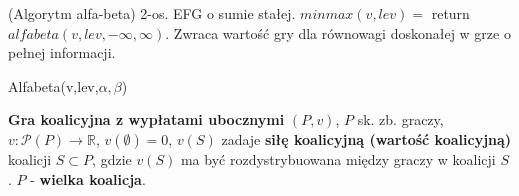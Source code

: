 \begin{twierdzenie}{(Algorytm alfa-beta)}
    2-os. EFG o sumie stałej. $minmax(v,lev)=$ return $alfabeta(v,lev,-\infty,\infty)$. Zwraca wartość gry dla równowagi doskonałej w grze o pełnej informacji.
\end{twierdzenie}
\begin{algorithm}[H]
    \SetAlgoLined
    
    \caption{Alfabeta(v,lev,$\alpha,\beta$)}
\end{algorithm}
\begin{definicja}{\textbf{Gra koalicyjna z wypłatami ubocznymi}}
    $(P,v)$, $P$ sk. zb. graczy, $v:\mathcal{P}(P)\rightarrow\mathbb{R}$, $v(\emptyset)=0$, $v(S)$ zadaje 
    \textbf{siłę koalicyjną (wartość koalicyjną)} koalicji $S\subset P$, gdzie $v(S)$ ma być rozdystrybuowana między graczy w koalicji $S$.
    $P$ - \textbf{wielka koalicja}.
\end{definicja}


